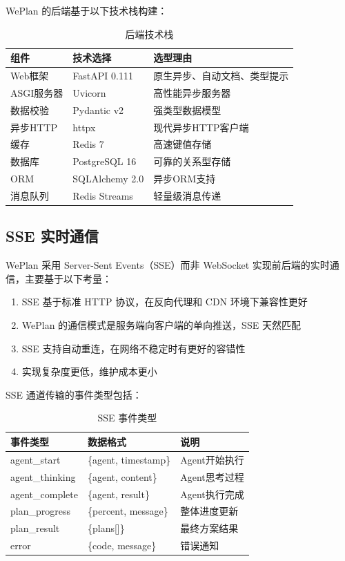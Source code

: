\documentclass[12pt,a4paper]{ctexart}
\begin{document}
WePlan 的后端基于以下技术栈构建：

\begin{table}[H]
\centering
\caption{后端技术栈}
\label{tab:backend-stack}
\renewcommand{\arraystretch}{1.3}
\begin{tabular}{p{3cm} p{3cm} p{6cm}}
\toprule
\textbf{组件} & \textbf{技术选择} & \textbf{选型理由} \\
\midrule
Web框架 & FastAPI 0.111 & 原生异步、自动文档、类型提示 \\
ASGI服务器 & Uvicorn & 高性能异步服务器 \\
数据校验 & Pydantic v2 & 强类型数据模型 \\
异步HTTP & httpx & 现代异步HTTP客户端 \\
缓存 & Redis 7 & 高速键值存储 \\
数据库 & PostgreSQL 16 & 可靠的关系型存储 \\
ORM & SQLAlchemy 2.0 & 异步ORM支持 \\
消息队列 & Redis Streams & 轻量级消息传递 \\
\bottomrule
\end{tabular}
\end{table}

\subsection{SSE 实时通信}

WePlan 采用 Server-Sent Events（SSE）而非 WebSocket 实现前后端的实时通信，主要基于以下考量：

\begin{enumerate}[leftmargin=2em]
  \item SSE 基于标准 HTTP 协议，在反向代理和 CDN 环境下兼容性更好
  \item WePlan 的通信模式是服务端向客户端的单向推送，SSE 天然匹配
  \item SSE 支持自动重连，在网络不稳定时有更好的容错性
  \item 实现复杂度更低，维护成本更小
\end{enumerate}

SSE 通道传输的事件类型包括：

\begin{table}[H]
\centering
\caption{SSE 事件类型}
\label{tab:sse-events}
\renewcommand{\arraystretch}{1.3}
\begin{tabular}{p{3.5cm} p{3.5cm} p{5cm}}
\toprule
\textbf{事件类型} & \textbf{数据格式} & \textbf{说明} \\
\midrule
agent\_start & \{agent, timestamp\} & Agent开始执行 \\
agent\_thinking & \{agent, content\} & Agent思考过程 \\
agent\_complete & \{agent, result\} & Agent执行完成 \\
plan\_progress & \{percent, message\} & 整体进度更新 \\
plan\_result & \{plans[]\} & 最终方案结果 \\
error & \{code, message\} & 错误通知 \\
\bottomrule
\end{tabular}
\end{table}
\end{document}
